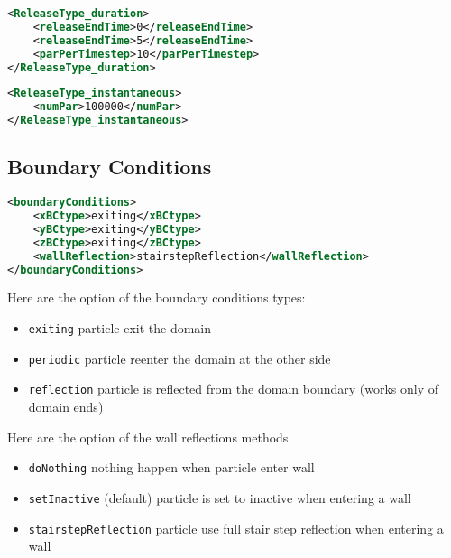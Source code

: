 \begin{lstlisting}[language=XML]
<ReleaseType_duration>
    <releaseEndTime>0</releaseEndTime>
    <releaseEndTime>5</releaseEndTime>
    <parPerTimestep>10</parPerTimestep>
</ReleaseType_duration>
\end{lstlisting}

\begin{lstlisting}[language=XML]
<ReleaseType_instantaneous>
    <numPar>100000</numPar>
</ReleaseType_instantaneous>
\end{lstlisting}

\subsection{Boundary Conditions}
\begin{lstlisting}[language=XML]
<boundaryConditions>
    <xBCtype>exiting</xBCtype>
    <yBCtype>exiting</yBCtype>
    <zBCtype>exiting</zBCtype>
    <wallReflection>stairstepReflection</wallReflection>
</boundaryConditions>
\end{lstlisting}

\noindent Here are the option of the boundary conditions types:
\begin{itemize}
    \item \texttt{exiting} particle exit the domain 
    \item \texttt{periodic} particle reenter the domain at the other side
    \item \texttt{reflection} particle is reflected from the domain boundary (works only of domain ends)
\end{itemize}

\noindent Here are the option of the wall reflections methods
\begin{itemize}
    \item \texttt{doNothing} nothing happen when particle enter wall
    \item \texttt{setInactive} (default) particle is set to inactive when entering a wall
    \item \texttt{stairstepReflection} particle use full stair step reflection when entering a wall
\end{itemize}


